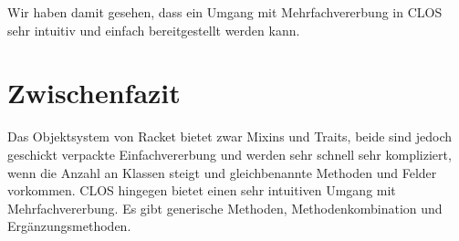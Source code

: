 % 
% 
% 
% 
% 
% 
% 

Wir haben damit gesehen, dass ein Umgang mit Mehrfachvererbung in CLOS sehr intuitiv und einfach bereitgestellt werden kann.

\section{Zwischenfazit}
Das Objektsystem von Racket bietet zwar Mixins und Traits, beide sind jedoch geschickt verpackte Einfachvererbung und werden sehr schnell sehr kompliziert, wenn die Anzahl an Klassen steigt und gleichbenannte Methoden und Felder vorkommen. CLOS hingegen bietet einen sehr intuitiven Umgang mit Mehrfachvererbung. Es gibt generische Methoden, Methodenkombination und Ergänzungsmethoden.